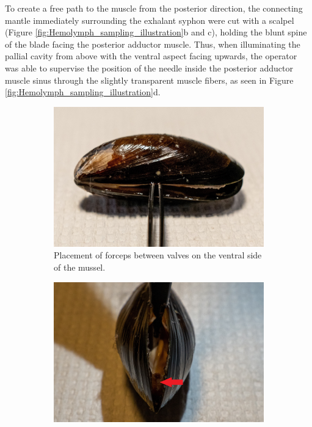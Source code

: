 To create a free path to the muscle from the posterior direction, the connecting mantle immediately surrounding the exhalant syphon were cut with a scalpel (Figure \ref{fig:Hemolymph_sampling_illustration}b and c), holding the blunt spine of the blade facing the posterior adductor muscle. Thus, when illuminating the pallial cavity from above with the ventral aspect facing upwards, the operator was able to supervise the position of the needle inside the posterior adductor muscle sinus through the slightly transparent muscle fibers, as seen in Figure \ref{fig:Hemolymph_sampling_illustration}d.

\begin{figure}[H]
    \centering
    \begin{subfigure}[b]{.45\textwidth}
        \centering
        \includegraphics[width=\textwidth]{figures/Sampling technique/forceps square color.jpg}
        \caption{Placement of forceps between valves on the ventral side of the mussel.}
        \label{sfig:a}
    \end{subfigure}
    \hfill
    \begin{subfigure}[b]{.45\textwidth}
        \centering
        \includegraphics[width=\textwidth]{figures/Sampling technique/uncut color 3495.jpg}

\end{subfigure}
\end{figure}

